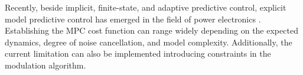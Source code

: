     Recently, beside implicit, finite-state, and adaptive predictive control, explicit model predictive control has emerged in the field of power electronics \cite{kutasi2010constrained}. Establishing the MPC cost function can range widely depending on the expected dynamics, degree of noise cancellation, and model complexity. Additionally, the current limitation can also be implemented introducing constraints in the modulation algorithm.\\	